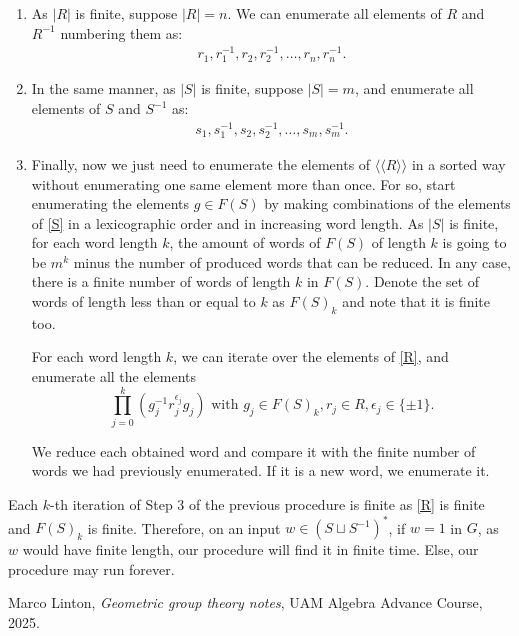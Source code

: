 \documentclass[11pt,a4paper]{article}
\begin{document}
\begin{enumerate}
  \item As $ |R| $ is finite, suppose $ |R| = n $. We can enumerate all elements of $ R $ and $ R^{-1} $ numbering them as:
  \begin{align} \label{R}
    r_1, r_1^{-1}, r_2, r_2^{-1}, \dots, r_n, r_n^{-1}.
  \end{align}
  
  \item In the same manner, as $ |S| $ is finite, suppose $ |S| = m $, and enumerate all elements of $ S $ and $ S^{-1} $ as:
  \begin{align} \label{S}
    s_1, s_1^{-1}, s_2, s_2^{-1}, \dots, s_m, s_m^{-1}.
  \end{align}

  \item Finally, now we just need to enumerate the elements of $ \langle \langle R \rangle \rangle $ in a sorted way without enumerating one same element more than once. For so, start enumerating the elements $ g \in F(S) $ by making combinations of the elements of \eqref{S} in a lexicographic order and in increasing word length. As $|S|$ is finite, for each word length $ k $, the amount of words of $ F(S) $ of length $ k $ is going to be $ m ^k $ minus the number of produced words that can be reduced. In any case, there is a finite number of words of length $ k $ in $ F(S) $. Denote the set of words of length less than or equal to $ k $ as  $ F(S)_k $ and note that it is finite too.
  
  For each word length $ k $, we can iterate over the elements of \eqref{R}, and enumerate all the elements
  $$
  \prod_{j=0}^k (g_j^{-1} r_j^{\epsilon_j} g_j) \text{ with } g_j \in F(S)_k, r_j \in R, \epsilon_j \in \{ \pm 1 \}.
  $$

  We reduce each obtained word and compare it with the finite number of words we had previously enumerated. If it is a new word, we enumerate it. 
\end{enumerate}

Each $k$-th iteration of Step 3 of the previous procedure is finite as \eqref{R} is finite and $ F(S)_k $ is finite. Therefore, on an input $ w \in (S \sqcup S^{-1})^* $, if $ w = 1 $ in $ G $, as $ w $ would have finite length, our procedure will find it in finite time. Else, our procedure may run forever.

\begin{thebibliography}{9}

  Marco Linton,
  \textit{Geometric group theory notes},
  UAM Algebra Advance Course, 2025.
  
\end{thebibliography}
\end{document}
